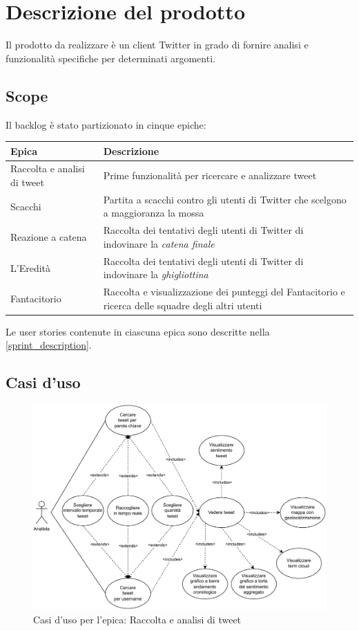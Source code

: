 \documentclass[11pt]{article}
\newcommand{\fref}[1]{\hyperref[#1]{\cref{#1}}}
\begin{document}
\tableofcontents
\newpage


\section{Descrizione del prodotto}
Il prodotto da realizzare è un client Twitter in grado di fornire analisi e funzionalità specifiche per determinati argomenti.

\subsection{Scope}
Il backlog è stato partizionato in cinque epiche:
\begin{center}
    \begin{tabular}{ | m{8em} | m{11cm} | }
        \hline
        {\textbf{Epica}} & {\textbf{Descrizione}} \\
        \hline
        Raccolta e analisi di tweet & Prime funzionalità per ricercare e analizzare tweet \\ 
        \hline
        Scacchi & Partita a scacchi contro gli utenti di Twitter che scelgono a maggioranza la mossa \\ 
        \hline
        Reazione a catena & Raccolta dei tentativi degli utenti di Twitter di indovinare la \textit{catena finale} \\ 
        \hline
        L'Eredità & Raccolta dei tentativi degli utenti di Twitter di indovinare la \textit{ghigliottina} \\ 
        \hline
        Fantacitorio & Raccolta e visualizzazione dei punteggi del Fantacitorio e ricerca delle squadre degli altri utenti \\ 
        \hline
    \end{tabular}
\end{center}
Le user stories contenute in ciascuna epica sono descritte nella \fref{sprint_description}.

\subsection{Casi d'uso}
\begin{figure}[H]
    \centering
    \includegraphics[width=14cm]{./img/usecase/tweet.pdf}
    \caption{Casi d'uso per l'epica: Raccolta e analisi di tweet}
\end{figure}
\end{document}
